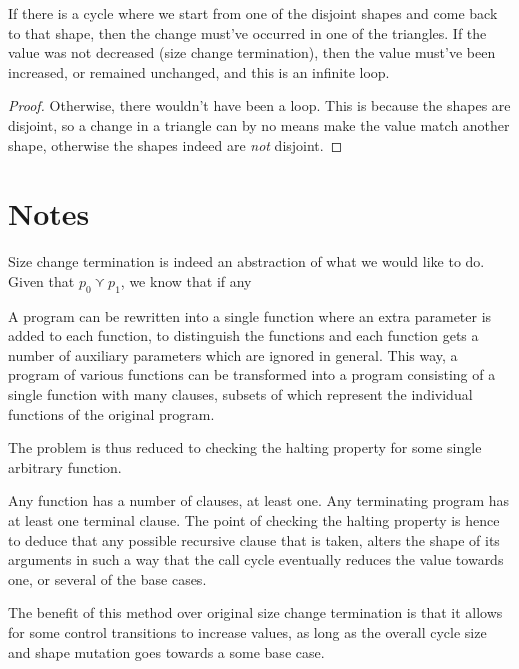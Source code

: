 


If there is a cycle where we start from one of the disjoint shapes and come
back to that shape, then the change must've occurred in one of the triangles.
If the value was not decreased (size change termination), then the value
must've been increased, or remained unchanged, and this is an infinite loop.


\begin{proof} Otherwise, there wouldn't have been a loop. This is because the
shapes are disjoint, so a change in a triangle can by no means make the value
match another shape, otherwise the shapes indeed are \emph{not} disjoint.
\end{proof}





\newpage

\section{Notes}

Size change termination is indeed an abstraction of what we would like to do.
Given that $p_0\curlyvee p_1$, we know that if any 


A program can be rewritten into a single function where an extra parameter is
added to each function, to distinguish the functions and each function gets a
number of auxiliary parameters which are ignored in general. This way, a
program of various functions can be transformed into a program consisting of a
single function with many clauses, subsets of which represent the individual
functions of the original program.

The problem is thus reduced to checking the halting property for some single
arbitrary function.

Any function has a number of clauses, at least one. Any terminating program has
at least one terminal clause. The point of checking the halting property is
hence to deduce that any possible recursive clause that is taken, alters the
shape of its arguments in such a way that the call cycle eventually reduces the
value towards one, or several of the base cases.

The benefit of this method over original size change termination is that it
allows for some control transitions to increase values, as long as the overall
cycle size and shape mutation goes towards a some base case.

